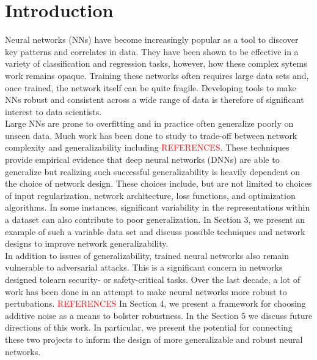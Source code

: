 \documentclass[12pt]{article}
\begin{document}
\section{Introduction}Neural networks (NNs) have become increasingly popular as a tool to discover key patterns and correlates in data. They have been shown to be effective in a variety of classification and regression tasks, however, how these complex sytems work remains opaque. Training these networks often requires large data sets and, once trained, the network itself can be quite fragile. Developing tools to make NNs robust and consistent across a wide range of data is therefore of significant interest to data scientists. \\
\indent Large NNs are prone to overfitting and in practice often generalize poorly on unseen data. Much work has been done to study to trade-off between network complexity and generalizability including \textcolor{red}{REFERENCES}. These techniques provide empirical evidence that deep neural networks (DNNs) are able to generalize but realizing such successful generalizability is heavily dependent on the choice of network design. These choices include, but are not limited to choices of input regularization, network architecture, loss functions, and optimization algorithms. In some instances, significant variability in the representations within a dataset can also contribute to poor generalization. In Section 3, we present an example of such a variable data set and discuss possible techniques and network designs to improve network generalizability. \\
\indent In addition to issues of generalizability, trained neural networks also remain vulnerable to adversarial attacks. This is a significant concern in networks designed tolearn  security- or safety-critical tasks. Over the last decade, a lot of work has been done in an attempt to make neural networks more robust to pertubations. \textcolor{red}{REFERENCES} In Section 4, we present a framework for choosing additive noise as a means to bolster robustness. In the Section 5 we discuss future directions of this work. In particular, we present the potential for connecting these two projects to inform the design of more generalizable and robust neural networks.
\end{document}
